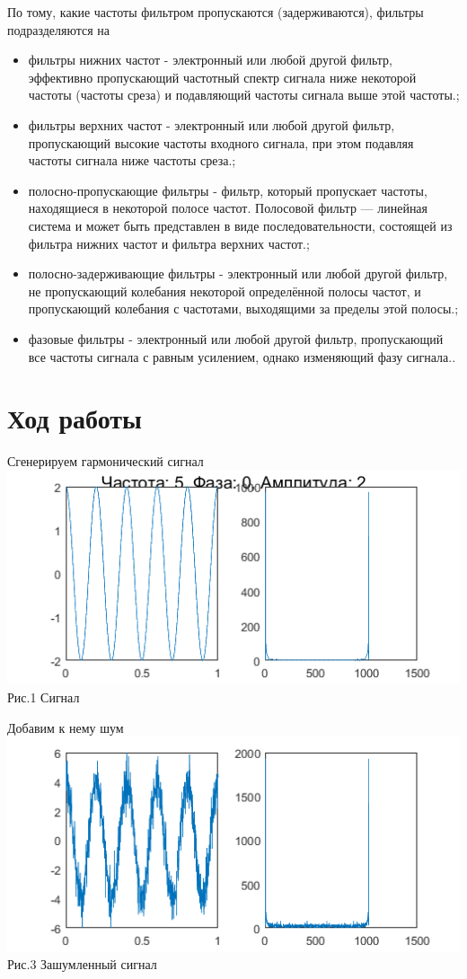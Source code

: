 \documentclass[a4paper,12pt]{article}
\begin{document}
По тому, какие частоты фильтром пропускаются (задерживаются), фильтры подразделяются на
\begin{itemize}
	\item фильтры нижних частот -  электронный или любой другой фильтр, эффективно пропускающий частотный спектр сигнала ниже некоторой частоты (частоты среза) и подавляющий частоты сигнала выше этой частоты.;
	\item фильтры верхних частот -  электронный или любой другой фильтр, пропускающий высокие частоты входного сигнала, при этом подавляя частоты сигнала ниже частоты среза.;
	\item полосно-пропускающие фильтры -  фильтр, который пропускает частоты, находящиеся в некоторой полосе частот. Полосовой фильтр — линейная система и может быть представлен в виде последовательности, состоящей из фильтра нижних частот и фильтра верхних частот.;
	\item полосно-задерживающие фильтры -  электронный или любой другой фильтр, не пропускающий колебания некоторой определённой полосы частот, и пропускающий колебания с частотами, выходящими за пределы этой полосы.;
	\item фазовые фильтры - электронный или любой другой фильтр, пропускающий все частоты сигнала с равным усилением, однако изменяющий фазу сигнала..
\end{itemize}
\newpage

\section{Ход работы}

Сгенерируем гармонический сигнал
\center\includegraphics{pictures/sig.png} \\ Рис.1 Сигнал


Добавим к нему шум
\center\includegraphics{pictures/shum.png} \\ Рис.3 Зашумленный сигнал
\end{document}
